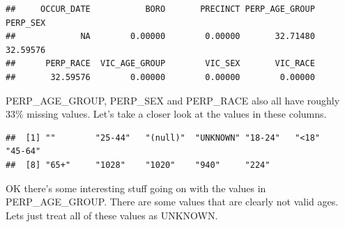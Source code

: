 \documentclass[
]{article}
\newenvironment{Shaded}{\begin{snugshade}}{\end{snugshade}}
\newcommand{\CommentTok}[1]{\textcolor[rgb]{0.56,0.35,0.01}{\textit{#1}}}
\newcommand{\FunctionTok}[1]{\textcolor[rgb]{0.13,0.29,0.53}{\textbf{#1}}}
\newcommand{\NormalTok}[1]{#1}
\newcommand{\OtherTok}[1]{\textcolor[rgb]{0.56,0.35,0.01}{#1}}
\newcommand{\SpecialCharTok}[1]{\textcolor[rgb]{0.81,0.36,0.00}{\textbf{#1}}}
\newcommand{\StringTok}[1]{\textcolor[rgb]{0.31,0.60,0.02}{#1}}
\begin{document}
\begin{verbatim}
##     OCCUR_DATE           BORO       PRECINCT PERP_AGE_GROUP       PERP_SEX 
##             NA        0.00000        0.00000       32.71480       32.59576 
##      PERP_RACE  VIC_AGE_GROUP        VIC_SEX       VIC_RACE 
##       32.59576        0.00000        0.00000        0.00000
\end{verbatim}

PERP\_AGE\_GROUP, PERP\_SEX and PERP\_RACE also all have roughly 33\%
missing values. Let's take a closer look at the values in these columns.

\begin{Shaded}
\end{Shaded}

\begin{verbatim}
##  [1] ""        "25-44"   "(null)"  "UNKNOWN" "18-24"   "<18"     "45-64"  
##  [8] "65+"     "1028"    "1020"    "940"     "224"
\end{verbatim}

OK there's some interesting stuff going on with the values in
PERP\_AGE\_GROUP. There are some values that are clearly not valid ages.
Lets just treat all of these values as UNKNOWN.

\begin{Shaded}
\end{Shaded}
\end{document}

